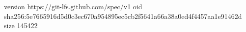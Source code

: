 version https://git-lfs.github.com/spec/v1
oid sha256:5e7665916d5d0c3ec670a954895ec5cb2f5641a66a38a0ed4f4457aa1e91462d
size 145422
